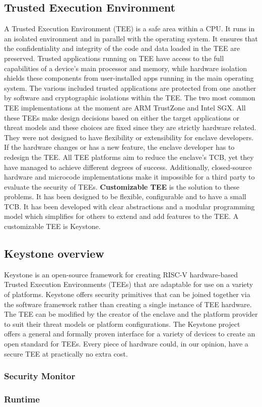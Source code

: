 \subsection{Trusted Execution Environment}
A Trusted Execution Environment (TEE) is a safe area within a CPU. It runs in an isolated environment and in parallel with the operating system.
It ensures that the confidentiality and integrity of the code and data loaded in the TEE are preserved. 
Trusted applications running on TEE have access to the full capabilities of a device's main processor and memory, while hardware isolation shields these components from user-installed apps running in the main operating system. The various included trusted applications are protected from one another by software and cryptographic isolations within the TEE.
\cite{IntroTEE}
The two most common TEE implementations at the moment are ARM TrustZone and Intel SGX. All these TEEs make design decisions based on either the target applications or threat models and these choices are fixed since they are strictly hardware related. They were not designed to have flexibility or extensibility for enclave developers.  If the hardware changes or has a new feature, the enclave developer has to redesign the TEE.
All TEE platforms aim to reduce the enclave's TCB, yet they have managed to achieve different degrees of success. Additionally, closed-source hardware and microcode implementations make it impossible for a third party to evaluate the security of TEEs.
\textbf{Customizable TEE} is the solution to these problems. It has been designed to be flexible, configurable and to have a small TCB. It has been developed with clear abstractions and a modular programming model which simplifies for others to extend and add features to the TEE. A customizable TEE is Keystone.
\cite{lee2020keystone} 
\subsection{Keystone overview}
Keystone \cite{lee2020keystone} is an open-source framework for creating RISC-V hardware-based Trusted Execution Environments (TEEs) that are adaptable for use on a variety of platforms. Keystone offers security primitives that can be joined together via the software framework rather than creating a single instance of TEE hardware. The TEE can be modified by the creator of the enclave and the platform provider to suit their threat models or platform configurations. The Keystone project offers a general and formally proven interface for a variety of devices to create an open standard for TEEs. Every piece of hardware could, in our opinion, have a secure TEE at practically no extra cost.
\subsubsection{Security Monitor}
\subsubsection{Runtime}